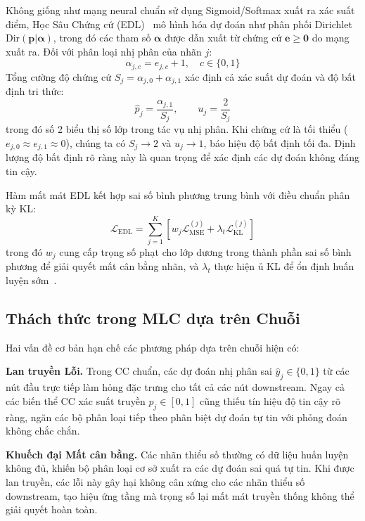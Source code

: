\documentclass[conference]{IEEEtran}
\begin{document}
Không giống như mạng neural chuẩn sử dụng Sigmoid/Softmax xuất ra xác suất điểm, Học Sâu Chứng cứ (EDL)~\cite{sensoy2018evidential} mô hình hóa dự đoán như phân phối Dirichlet $\mathrm{Dir}(\mathbf{p}|\boldsymbol{\alpha})$, trong đó các tham số $\boldsymbol{\alpha}$ được dẫn xuất từ chứng cứ $\mathbf{e} \ge \mathbf{0}$ do mạng xuất ra. Đối với phân loại nhị phân của nhãn $j$:
\begin{equation}
    \alpha_{j,c} = e_{j,c} + 1, \quad c \in \{0, 1\}
\end{equation}
Tổng cường độ chứng cứ $S_j = \alpha_{j,0} + \alpha_{j,1}$ xác định cả xác suất dự đoán và độ bất định tri thức:
\begin{equation}
    \hat{p}_j = \frac{\alpha_{j,1}}{S_j}, \qquad u_j = \frac{2}{S_j}
    \label{eq:edl_outputs}
\end{equation}
trong đó số 2 biểu thị số lớp trong tác vụ nhị phân. Khi chứng cứ là tối thiểu ($e_{j,0} \approx e_{j,1} \approx 0$), chúng ta có $S_j \to 2$ và $u_j \to 1$, báo hiệu độ bất định tối đa. Định lượng độ bất định rõ ràng này là quan trọng để xác định các dự đoán không đáng tin cậy.

Hàm mất mát EDL kết hợp sai số bình phương trung bình với điều chuẩn phân kỳ KL:
\begin{equation}
    \mathcal{L}_{\mathrm{EDL}} = \sum_{j=1}^{K} \left[ w_j \mathcal{L}_{\mathrm{MSE}}^{(j)} + \lambda_t \mathcal{L}_{\mathrm{KL}}^{(j)} \right]
    \label{eq:edl_loss_compact}
\end{equation}
trong đó $w_j$ cung cấp trọng số phạt cho lớp dương trong thành phần sai số bình phương để giải quyết mất cân bằng nhãn, và $\lambda_t$ thực hiện ủ KL để ổn định huấn luyện sớm~\cite{sensoy2018evidential}.

\subsection{Thách thức trong MLC dựa trên Chuỗi}

Hai vấn đề cơ bản hạn chế các phương pháp dựa trên chuỗi hiện có:

\textbf{Lan truyền Lỗi.} Trong CC chuẩn, các dự đoán nhị phân sai $\hat{y}_j \in \{0,1\}$ từ các nút đầu trực tiếp làm hỏng đặc trưng cho tất cả các nút downstream. Ngay cả các biến thể CC xác suất truyền $p_j \in [0,1]$ cũng thiếu tín hiệu độ tin cậy rõ ràng, ngăn các bộ phân loại tiếp theo phân biệt dự đoán tự tin với phỏng đoán không chắc chắn.

\textbf{Khuếch đại Mất cân bằng.} Các nhãn thiểu số thường có dữ liệu huấn luyện không đủ, khiến bộ phân loại cơ sở xuất ra các dự đoán sai quá tự tin. Khi được lan truyền, các lỗi này gây hại không cân xứng cho các nhãn thiểu số downstream, tạo hiệu ứng tầng mà trọng số lại mất mát truyền thống không thể giải quyết hoàn toàn.
\end{document}
